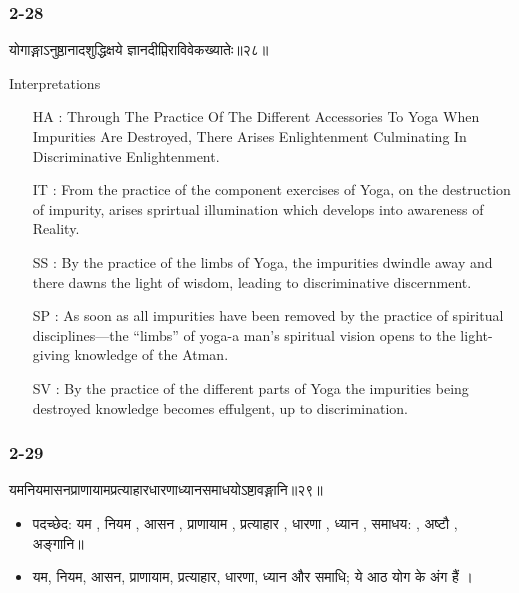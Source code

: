 \begin{frame}[fragile]\frametitle{2-28}
\begin{sanskrit}
योगाङ्गाऽनुष्ठानादशुद्धिक्षये ज्ञानदीप्तिराविवेकख्यातेः॥२८॥
\end{sanskrit}

Interpretations
\begin{itemize}
\item [HA]: Through The Practice Of The Different Accessories To Yoga When Impurities Are Destroyed, There Arises Enlightenment Culminating In Discriminative Enlightenment.
\item [IT]: From the practice of the component exercises of Yoga, on the destruction of impurity, arises sprirtual illumination which develops into awareness of Reality.
\item [SS]: By the practice of the limbs of Yoga, the impurities dwindle away and there dawns the light of wisdom, leading to discriminative discernment.
\item [SP]: As soon as all impurities have been removed by the practice of spiritual disciplines—the “limbs” of yoga-a man’s spiritual vision opens to the light-giving knowledge of the Atman.
\item [SV]: By the practice of the different parts of Yoga the impurities being destroyed knowledge becomes effulgent, up to discrimination. 
\end{itemize}
	
\end{frame}

\begin{frame}[fragile]\frametitle{2-29}
\begin{sanskrit}
यमनियमासनप्राणायामप्रत्याहारधारणाध्यानसमाधयोऽष्टावङ्गानि॥२९॥
\end{sanskrit}

\begin{itemize}
\item पदच्छेद: यम , नियम , आसन , प्राणायाम , प्रत्याहार , धारणा , ध्यान , समाधय: , अष्टौ , अङ्गानि॥
\item यम, नियम, आसन, प्राणायाम, प्रत्याहार, धारणा, ध्यान और समाधि; ये आठ योग के अंग हैं ।
\end{itemize}	
	
\end{frame}


